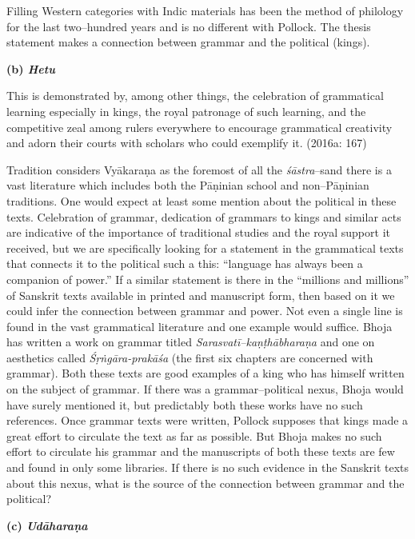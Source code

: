 Filling Western categories with Indic materials has been the method of philology for the last two–hundred years and is no different with Pollock. The thesis statement makes a connection between grammar and the political (kings).

\textbf{(b) \textit{Hetu}}

\begin{myquote}
This is demonstrated by, among other things, the celebration of grammatical learning especially in kings, the royal patronage of such learning, and the competitive zeal among rulers everywhere to encourage grammatical creativity and adorn their courts with scholars who could exemplify it. (2016a: 167)
\end{myquote}

Tradition considers Vyākaraṇa as the foremost of all the \textit{śāstra}–s\break and there is a vast literature which includes both the Pāṇinian school and non–Pāṇinian traditions. One would expect at least some mention about the political in these texts. Celebration of grammar, dedication of grammars to kings and similar acts are indicative of the importance of traditional studies and the royal support it received, but we are specifically looking for a statement in the grammatical texts that connects it to the political such a this: “language has always been a companion of power.” If a similar statement is there in the “millions and millions” of Sanskrit texts available in printed and manuscript form, then based on it we could infer the connection between grammar and power. Not even a single line is found in the vast grammatical literature and one example would suffice. Bhoja has written a work on grammar titled \textit{Sarasvatī–kaṇṭhābharaṇa} and one on aesthetics called \textit{Śṛṅgāra-prakāśa} (the first six chapters are concerned with grammar). Both these texts are good examples of a king who has himself written on the subject of grammar. If there was a grammar–political nexus, Bhoja would have surely mentioned it, but predictably both these works have no such references. Once grammar texts were written, Pollock supposes that kings made a great effort to circulate the text as far as possible. But Bhoja makes no such effort to circulate his grammar and the manuscripts of both these texts are few and found in only some libraries. If there is no such evidence in the Sanskrit texts about this nexus, what is the source of the connection between grammar and the political?

\textbf{(c) \textit{Udāharaṇa}}

